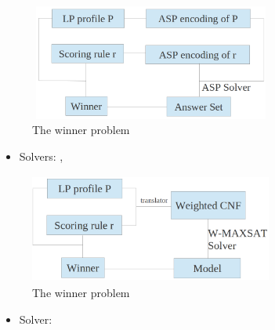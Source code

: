 {
	\begin{figure}
		\centering
		\includegraphics[width=8cm,height=3.8cm]{figs/LPTrees/asp_win_struct.png}
		\caption{The winner problem}
	\end{figure}

	\vspace{-0.45cm}

	\begin{itemize}
		\item Solvers: , 
	\end{itemize}
}

{
	\begin{figure}
		\centering
		\includegraphics[width=8cm,height=3.6cm]{figs/LPTrees/sat_win_struct.png}
		\caption{The winner problem}
	\end{figure}

	\vspace{-0.45cm}

	\begin{itemize}
		\item Solver: 
	\end{itemize}
}

%

